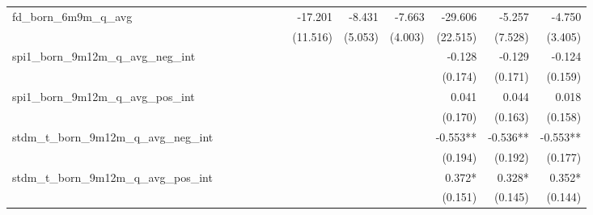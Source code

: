 \begin{tabular}{lrrrrrrrrrrrr}
fd\_born\_6m9m\_q\_avg                      &              &              &              &              &              &              &      -17.201 &       -8.431 &       -7.663 &      -29.606 &       -5.257 &       -4.750 \\ 
                                            &              &              &              &              &              &              &     (11.516) &      (5.053) &      (4.003) &     (22.515) &      (7.528) &      (3.405) \\ 
spi1\_born\_9m12m\_q\_avg\_neg\_int         &              &              &              &              &              &              &              &              &              &       -0.128 &       -0.129 &       -0.124 \\ 
                                            &              &              &              &              &              &              &              &              &              &      (0.174) &      (0.171) &      (0.159) \\ 
spi1\_born\_9m12m\_q\_avg\_pos\_int         &              &              &              &              &              &              &              &              &              &        0.041 &        0.044 &        0.018 \\ 
                                            &              &              &              &              &              &              &              &              &              &      (0.170) &      (0.163) &      (0.158) \\ 
stdm\_t\_born\_9m12m\_q\_avg\_neg\_int      &              &              &              &              &              &              &              &              &              &     -0.553** &     -0.536** &     -0.553** \\ 
                                            &              &              &              &              &              &              &              &              &              &      (0.194) &      (0.192) &      (0.177) \\ 
stdm\_t\_born\_9m12m\_q\_avg\_pos\_int      &              &              &              &              &              &              &              &              &              &       0.372* &       0.328* &       0.352* \\ 
                                            &              &              &              &              &              &              &              &              &              &      (0.151) &      (0.145) &      (0.144) \\ 

\end{tabular}
